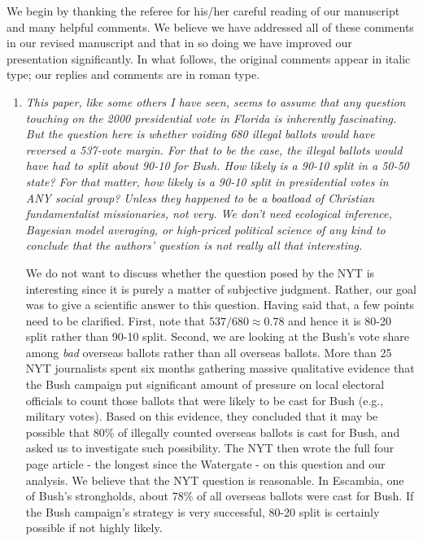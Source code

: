 \documentclass[11pt]{article}
\begin{document}
We begin by thanking the referee for his/her careful reading of our
manuscript and many helpful comments. We believe we have addressed all
of these comments in our revised manuscript and that in so doing we
have improved our presentation significantly.  In what follows, the
original comments appear in italic type; our replies and comments are
in roman type.

\bigskip


\begin{enumerate}
\item {\it This paper, like some others I have seen, seems to assume
    that any question touching on the 2000 presidential vote in
    Florida is inherently fascinating.  But the question here is
    whether voiding 680 illegal ballots would have reversed a 537-vote
    margin.  For that to be the case, the illegal ballots would have
    had to split about 90-10 for Bush.  How likely is a 90-10 split in
    a 50-50 state?  For that matter, how likely is a 90-10 split in
    presidential votes in ANY social group?  Unless they happened to
    be a boatload of Christian fundamentalist missionaries, not very.
    We don't need ecological inference, Bayesian model averaging, or
    high-priced political science of any kind to conclude that the
    authors' question is not really all that interesting.}
  
  We do not want to discuss whether the question posed by the NYT is
  interesting since it is purely a matter of subjective judgment.
  Rather, our goal was to give a scientific answer to this question.
  Having said that, a few points need to be clarified.  First, note
  that $537/680 \approx 0.78$ and hence it is 80-20 split rather than
  90-10 split. Second, we are looking at the Bush's vote share among
  {\it bad} overseas ballots rather than all overseas ballots. More
  than 25 NYT journalists spent six months gathering massive
  qualitative evidence that the Bush campaign put significant amount
  of pressure on local electoral officials to count those ballots that
  were likely to be cast for Bush (e.g., military votes).  Based on
  this evidence, they concluded that it may be possible that 80\% of
  illegally counted overseas ballots is cast for Bush, and asked us to
  investigate such possibility. The NYT then wrote the full four page
  article - the longest since the Watergate - on this question and our
  analysis. We believe that the NYT question is reasonable. In
  Escambia, one of Bush's strongholds, about 78\% of all overseas
  ballots were cast for Bush. If the Bush campaign's strategy is very
  successful, 80-20 split is certainly possible if not highly likely.


\end{enumerate}
\end{document}
